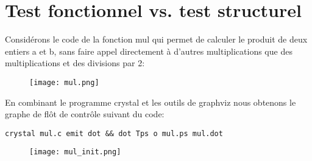 \documentclass{article}
\begin{document}
\newpage
\section*{Test fonctionnel vs. test structurel}

Considérons le code de la fonction \textsf{mul} qui permet de calculer le produit de deux entiers a et b, sans faire
appel directement à d’autres multiplications que des multiplications et des divisions par 2:  
 \begin{figure}[H]
    \centering
    \texttt{[image: mul.png]}
 \end{figure}

\newpage
\noindent En combinant le programme \textsf{crystal} et les outils de \textsf{graphviz} nous obtenons le graphe de flôt de contrôle suivant du code:
\begin{lstlisting}
crystal mul.c emit dot && dot Tps o mul.ps mul.dot
\end{lstlisting}
 \begin{figure}[H]
    \centering
    \texttt{[image: mul\_init.png]}
 \end{figure}
\end{document}
